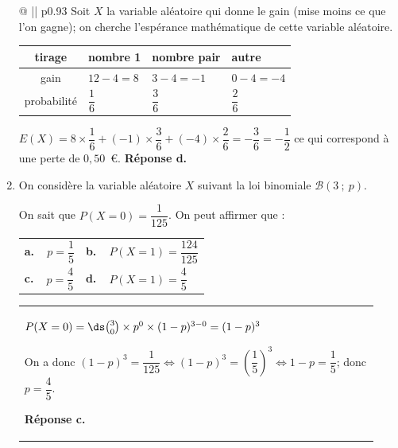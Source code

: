 \begin{enumerate}
\medskip

\begin{tabular}{@{\hspace*{0.05\linewidth}} || p{0.93\linewidth}}
Soit $X$ la variable aléatoire qui donne le gain (mise moins ce que l'on gagne); on cherche l'espérance mathématique de cette variable aléatoire.

\begin{center}
\begin{tabularx}{0.9\linewidth}{|c|*{3}{>{\centering \arraybackslash}X|}}
\hline
tirage & nombre 1 & nombre pair & autre\\
\hline
gain &	 $12-4=8$ & $3-4=-1$ & $0-4=-4$\\
\hline
probabilité & $\dfrac{1}{6}$ & $\dfrac{3}{6}$ & $\dfrac{2}{6}$\rule[-12pt]{0pt}{30pt}\\
\hline
\end{tabularx}
\end{center}

$E(X)= 8\times \dfrac{1}{6} +(-1)\times \dfrac{3}{6} + (-4)\times \dfrac{2}{6}
= -\dfrac{3}{6}=-\dfrac{1}{2}$ ce qui correspond à une perte de $0,50$~\euro.
\hfill\textbf{Réponse d.}
\end{tabular}

\medskip

\item On considère la variable aléatoire $X$ suivant la loi binomiale $\mathcal{B}(3~;~p)$.

On sait que $P(X = 0) = \dfrac{1}{125}$. On peut affirmer que :

\begin{center}
\renewcommand\arraystretch{1.9}
\begin{tabularx}{\linewidth}{*{2}{X}}
\textbf{a.~~}$p = \dfrac{1}{5}$&\textbf{b.~~}$P(X = 1) =\dfrac{124}{125}$\\
\textbf{c.~~}$p = \dfrac{4}{5}$&\textbf{d.~~}$P(X= 1) =\dfrac{4}{5}$
\end{tabularx}
\end{center}

\medskip

\begin{tabular}{@{\hspace*{0.05\linewidth}} || p{0.93\linewidth}}
$P(X=0) = \ds\binom{3}{0}\times p^0 \times (1-p)^{3-0} =  (1-p)^3$

On a donc $(1-p)^3 = \dfrac{1}{125} \iff (1-p)^3 = \left ( \dfrac{1}{5}\right )^3 \iff 1-p=\dfrac{1}{5}$; donc $p=\dfrac{4}{5}$.

\hfill\textbf{Réponse c.}
\end{tabular}
\end{enumerate}
